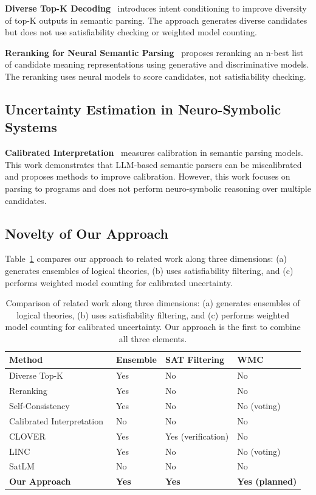 \documentclass[11pt,letterpaper]{article}
\begin{document}
\textbf{Diverse Top-K Decoding}~\cite{Gupta2022} introduces intent conditioning to improve diversity of top-K outputs in semantic parsing. The approach generates diverse candidates but does not use satisfiability checking or weighted model counting.

\textbf{Reranking for Neural Semantic Parsing}~\cite{Yin2019} proposes reranking an n-best list of candidate meaning representations using generative and discriminative models. The reranking uses neural models to score candidates, not satisfiability checking.

\subsection{Uncertainty Estimation in Neuro-Symbolic Systems}

\textbf{Calibrated Interpretation}~\cite{StengelEskin2023} measures calibration in semantic parsing models. This work demonstrates that LLM-based semantic parsers can be miscalibrated and proposes methods to improve calibration. However, this work focuses on parsing to programs and does not perform neuro-symbolic reasoning over multiple candidates.

\subsection{Novelty of Our Approach}

Table~\ref{tab:novelty} compares our approach to related work along three dimensions: (a) generates ensembles of logical theories, (b) uses satisfiability filtering, and (c) performs weighted model counting for calibrated uncertainty.

\begin{table}[!htbp]
\centering
\caption{Comparison of related work along three dimensions: (a) generates ensembles of logical theories, (b) uses satisfiability filtering, and (c) performs weighted model counting for calibrated uncertainty. Our approach is the first to combine all three elements.}
\label{tab:novelty}
\begin{tabular}{llll}
\toprule
Method & Ensemble & SAT Filtering & WMC \\
\midrule
Diverse Top-K~\cite{Gupta2022} & Yes & No & No \\
Reranking~\cite{Yin2019} & Yes & No & No \\
Self-Consistency~\cite{Wang2023} & Yes & No & No (voting) \\
Calibrated Interpretation~\cite{StengelEskin2023} & No & No & No \\
CLOVER~\cite{Ryu2025} & Yes & Yes (verification) & No \\
LINC~\cite{Olausson2023} & Yes & No & No (voting) \\
SatLM~\cite{Ye2023} & No & No & No \\
\textbf{Our Approach} & \textbf{Yes} & \textbf{Yes} & \textbf{Yes (planned)} \\
\bottomrule
\end{tabular}
\end{table}
\end{document}
